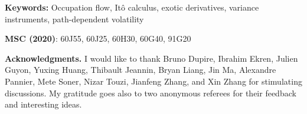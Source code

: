 \documentclass[11pt]{article}
\theoremstyle{plain}
\theoremstyle{definition}
\begin{document}
\begin{abstract}

\end{abstract}
\vspace{2mm}

\textbf{Keywords:}   Occupation  flow, %
Itô calculus, exotic derivatives, 
 variance instruments, path-dependent volatility %
\\ \vspace{-2mm}
	



\textbf{MSC (2020)}:  
60J55, %
60J25, %
60H30, %
60G40, %
91G20 %



\vspace{13mm}

\textbf{Acknowledgments.} 
I would like to thank Bruno Dupire, Ibrahim Ekren, Julien Guyon, Yuxing Huang, Thibault Jeannin,  Bryan Liang, Jin Ma, Alexandre Pannier, Mete Soner, Nizar Touzi,  Jianfeng Zhang, and  Xin Zhang  for stimulating discussions. My gratitude goes also to two anonymous referees for their feedback and interesting ideas. 
 
\newpage
\setcounter{tocdepth}{2}
\tableofcontents
\end{document}
